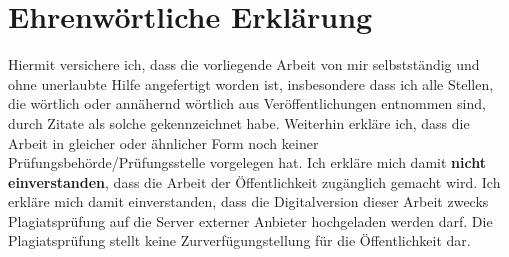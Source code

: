 \documentclass[12pt,oneside,titlepage]{scrartcl}
\begin{document}
\newpage %



\printbibliography[heading=bibintoc,title=Literaturverzeichnis]

\newpage %
\section*{Ehrenwörtliche Erklärung} 
	Hiermit versichere ich, dass die vorliegende Arbeit von mir selbstständig und ohne unerlaubte Hilfe angefertigt worden ist, insbesondere dass ich alle Stellen, die wörtlich oder annähernd wörtlich aus Veröffentlichungen entnommen sind, durch Zitate als solche gekennzeichnet habe. Weiterhin erkläre ich, dass die Arbeit in gleicher oder ähnlicher Form noch keiner Prüfungsbehörde/Prüfungsstelle vorgelegen hat. Ich erkläre mich damit \textbf{nicht einverstanden}, dass die Arbeit der Öffentlichkeit zugänglich gemacht wird. Ich erkläre mich damit einverstanden, dass die Digitalversion dieser Arbeit zwecks Plagiatsprüfung auf die Server externer Anbieter hochgeladen werden darf. Die Plagiatsprüfung stellt keine Zurverfügungstellung für die Öffentlichkeit dar.

			\par\medskip
			\par\medskip

			\vspace{5cm}
\end{document}
